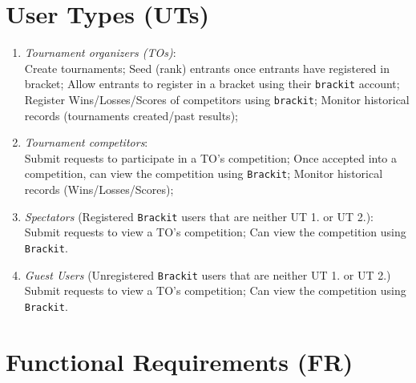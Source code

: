 \documentclass{article}
\begin{document}
\section*{User Types (UTs)}
\begin{enumerate}
    \item{\textit{Tournament organizers (TOs)}}: \\Create tournaments; Seed (rank) entrants once entrants have registered in bracket; 
    Allow entrants to register in a bracket using their \texttt{brackit} account; Register Wins/Losses/Scores of competitors using \texttt{brackit};
    Monitor historical records (tournaments created/past results);
        

    \item{\textit{Tournament competitors}}: \\ Submit requests to participate in a TO's competition; Once accepted into a competition, can view 
    the competition using \texttt{Brackit}; Monitor historical records (Wins/Losses/Scores);
    \item{\textit{Spectators} (Registered \texttt{Brackit} users that are neither UT 1. or UT 2.):}
    \\ Submit requests to view a TO's competition; Can view 
    the competition using \texttt{Brackit}.
    
    \item{\textit{Guest Users} (Unregistered \texttt{Brackit} users that are neither UT 1. or UT 2.)}
    \\ Submit requests to view a TO's competition; Can view 
    the competition using \texttt{Brackit}.
\end{enumerate}
\section*{Functional Requirements (FR)}
\end{document}
